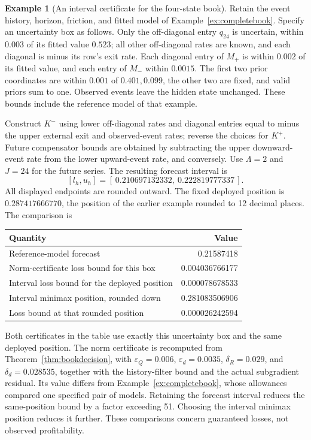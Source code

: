 \documentclass[11pt]{article}
\theoremstyle{plain}
\theoremstyle{definition}
\newtheorem{example}[theorem]{Example}
\theoremstyle{remark}
\begin{document}
\begin{example}[An interval certificate for the four-state book]
\label{ex:rationalbookinterval}
Retain the event history, horizon, friction, and fitted model of
Example~\ref{ex:completebook}. Specify an uncertainty box as follows.
Only the off-diagonal entry \(q_{24}\) is uncertain, within
\(0.003\) of its fitted value \(0.523\); all other off-diagonal
rates are known, and each diagonal is minus its row's exit rate.
Each diagonal entry of \(M_+\) is within \(0.002\) of its fitted
value, and each entry of \(M_-\) within \(0.0015\).
The first two prior coordinates are within \(0.001\) of
\(0.401,0.099\), the other two are fixed, and valid priors
sum to one. Observed events leave the hidden state unchanged.
These bounds include the reference model of that example.

Construct \(K^-\) using lower off-diagonal rates and diagonal
entries equal to minus the upper external exit and observed-event
rates; reverse the choices for \(K^+\). Future compensator bounds
are obtained by subtracting the upper downward-event rate from
the lower upward-event rate, and conversely.
Use \(\Lambda=2\) and \(J=24\) for the future series.
The resulting forecast interval is
\[
 [l_h,u_h]=[\,0.210697132332,\ 0.222819777337\,].
\]
All displayed endpoints are rounded outward. The fixed deployed
position is \(0.287417666770\), the position of the earlier
example rounded to 12 decimal places. The comparison is
\begin{center}
\begin{tabular}{@{}lr@{}}
\toprule
Quantity&Value\\
\midrule
Reference-model forecast&0.21587418\\
Norm-certificate loss bound for this box&0.004036766177\\
Interval loss bound for the deployed position&0.000078678533\\
Interval minimax position, rounded down&0.281083506906\\
Loss bound at that rounded position&0.000026242594\\
\bottomrule
\end{tabular}
\end{center}
Both certificates in the table use exactly this uncertainty box
and the same deployed position. The norm certificate is recomputed
from Theorem~\ref{thm:bookdecision}, with
\(\varepsilon_Q=0.006\), \(\varepsilon_d=0.0035\),
\(\delta_R=0.029\), and \(\delta_d=0.028535\), together with
the history-filter bound and the actual subgradient residual.
Its value differs from Example~\ref{ex:completebook}, whose
allowances compared one specified pair of models.
Retaining the forecast interval reduces the same-position bound
by a factor exceeding 51. Choosing the interval minimax position
reduces it further. These comparisons concern guaranteed losses,
not observed profitability.


\end{example}
\end{document}
